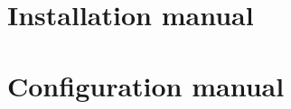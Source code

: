 \section{Installation manual}
\label{anexo_manual_instalacion}


\section{Configuration manual}
\label{anexo_manual_configuracion}